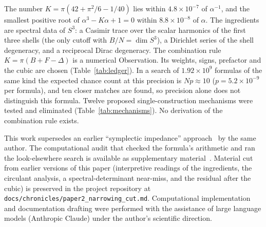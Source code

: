 \documentclass[aps,prl,twocolumn,superscriptaddress]{revtex4-2}
\begin{document}
The number $K = \pi(42 + \pi^2/6 - 1/40)$ lies within
$4.8\times10^{-7}$ of $\alpha^{-1}$, and the smallest positive root of
$\alpha^3 - K\alpha + 1 = 0$ within $8.8\times10^{-8}$ of $\alpha$. The
ingredients are spectral data of $S^3$: a Casimir trace over the scalar
harmonics of the first three shells (the only cutoff with
$B/N = \dim S^3$), a Dirichlet series of the shell degeneracy, and a
reciprocal Dirac degeneracy. The combination rule
$K = \pi(B + F - \Delta)$ is a numerical Observation. Its weights,
signs, prefactor and the cubic are chosen (Table~\ref{tab:ledger}). In a
search of $1.92\times10^9$ formulas of the same kind the expected chance
count at this precision is $Np \approx 10$ ($p = 5.2\times10^{-9}$ per
formula), and ten closer matches are found, so precision alone does not
distinguish this formula. Twelve proposed single-construction mechanisms
were tested and eliminated (Table~\ref{tab:mechanisms}). No derivation
of the combination rule exists.


\begin{acknowledgments}
This work supersedes an earlier ``symplectic impedance''
approach~\cite{alpha_hopf_v1} by the same author. The computational audit
that checked the formula's arithmetic and ran the look-elsewhere search
is available as supplementary material~\cite{phase2_audit}. Material
cut from earlier versions of this paper (interpretive readings of the
ingredients, the circulant analysis, a spectral-determinant near-miss,
and the residual after the cubic) is preserved in the project
repository at \texttt{docs/chronicles/paper2\_narrowing\_cut.md}.
Computational implementation and documentation drafting were performed
with the assistance of large language models (Anthropic Claude) under
the author's scientific direction.
\end{acknowledgments}
\end{document}
